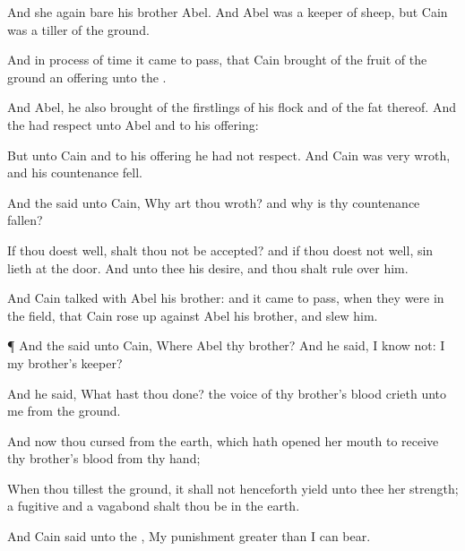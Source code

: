 {And she
again
bare his
brother
Abel. And
Abel was a
keeper of
sheep, but
Cain was a
tiller of the
ground.


\par }{\PP {}And in
process of
time it came to pass, that
Cain
brought of the
fruit of the
ground an
offering unto the
{}.

And
Abel,
he also
brought of the
firstlings of his
flock and of the
fat thereof. And the
{} had
respect unto
Abel and to his
offering:

But unto
Cain and to his
offering he had not
respect. And
Cain was
very
wroth, and his
countenance
fell.


\par }{\PP {}And the
{}
said unto
Cain, Why art thou
wroth? and why is thy
countenance
fallen?

If thou doest
well, shalt thou not be
accepted? and if thou doest not
well,
sin
lieth at the
door. And unto thee
{} his
desire, and thou shalt
rule over him.

And
Cain
talked
with
Abel his
brother: and it came to pass, when they were in the
field, that
Cain rose
up
against
Abel his
brother, and slew
him.


\par }{\PP {}¶ And the
{}
said unto
Cain,
Where
{}
Abel thy
brother? And he
said, I
know not:
{} I my
brother’s
keeper?

And he
said,
What hast thou
done? the
voice of thy
brother’s
blood
crieth unto me from the
ground.

And now
{} thou
cursed from the
earth, which hath
opened her
mouth to
receive thy
brother’s
blood from thy
hand;

When thou
tillest the
ground, it shall not
henceforth
yield unto thee her
strength; a
fugitive and a
vagabond shalt thou be in the
earth.


\par }{\PP {}And
Cain
said unto the
{}, My
punishment
{}
greater than I can
bear.

}
